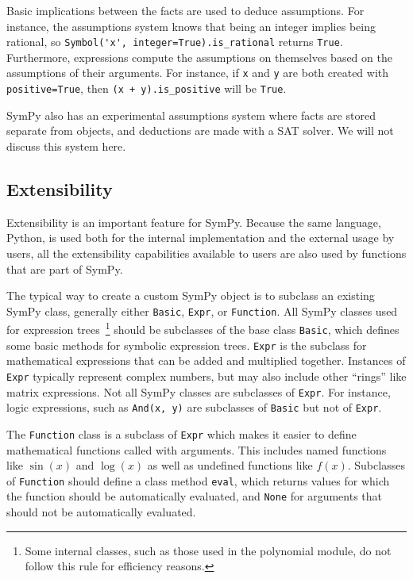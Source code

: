 Basic implications between the facts are used to deduce assumptions. For
instance, the assumptions system knows that being an integer implies being
rational, so \verb|Symbol('x', integer=True).is_rational| returns
\texttt{True}. Furthermore, expressions compute the assumptions on themselves
based on the assumptions of their arguments. For instance, if \texttt{x} and
\texttt{y} are both created with \texttt{positive=True}, then
\verb|(x + y).is_positive| will be \texttt{True}.

SymPy also has an experimental assumptions system where facts are stored
separate from objects, and deductions are made with a SAT solver. We will not
discuss this system here.

\subsection{Extensibility}

Extensibility is an important feature for SymPy. Because the same language,
Python, is used both for the internal implementation and the external usage by
users, all the extensibility capabilities available to users are also used by
functions that are part of SymPy.

The typical way to create a custom SymPy object is to subclass an existing
SymPy class, generally either \texttt{Basic}, \texttt{Expr}, or
\texttt{Function}. All SymPy classes used for expression trees~\footnote{Some
  internal classes, such as those used in the polynomial module, do not follow
  this rule for efficiency reasons.} should be subclasses of the base class
\texttt{Basic}, which defines some basic methods for symbolic expression
trees. \texttt{Expr} is the subclass for mathematical expressions that can be
added and multiplied together. Instances of \texttt{Expr} typically represent
complex numbers, but may also include other ``rings'' like matrix expressions.
Not all SymPy classes are subclasses of \texttt{Expr}. For instance, logic expressions, such
as \verb|And(x, y)| are subclasses of \texttt{Basic} but not of \texttt{Expr}.

The \texttt{Function} class is a subclass of \texttt{Expr} which makes it
easier to define mathematical functions called with arguments. This includes
named functions like $\sin(x)$ and $\log(x)$ as well as undefined functions
like $f(x)$. Subclasses of \texttt{Function} should define a
class method \texttt{eval}, which returns values for which the function should
be automatically evaluated, and \texttt{None} for arguments that should not be
automatically evaluated.

